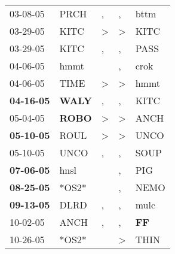 \begin{supertabular}{p{0.07\textwidth}p{0.06\textwidth}p{0.02\textwidth}p{0.02\textwidth}p{0.06\textwidth}}
          03-08-05\textsuperscript{} &           PRCH\textsuperscript{} &                , &                , &           bttm\textsuperscript{} \\
          03-29-05\textsuperscript{} &           KITC\textsuperscript{} &     \textgreater &     \textgreater &           KITC\textsuperscript{} \\
          03-29-05\textsuperscript{} &           KITC\textsuperscript{} &                , &                , &           PASS\textsuperscript{} \\
          04-06-05\textsuperscript{} &           hmmt\textsuperscript{} &                  &                , &           crok\textsuperscript{} \\
          04-06-05\textsuperscript{} &           TIME\textsuperscript{} &     \textgreater &     \textgreater &           hmmt\textsuperscript{} \\
 \textbf{04-16-05\textsuperscript{}} &  \textbf{WALY\textsuperscript{}} &                , &                , &           KITC\textsuperscript{} \\
          05-04-05\textsuperscript{} &  \textbf{ROBO\textsuperscript{}} &     \textgreater &     \textgreater &           ANCH\textsuperscript{} \\
 \textbf{05-10-05\textsuperscript{}} &           ROUL\textsuperscript{} &     \textgreater &     \textgreater &           UNCO\textsuperscript{} \\
          05-10-05\textsuperscript{} &           UNCO\textsuperscript{} &                , &                , &           SOUP\textsuperscript{} \\
 \textbf{07-06-05\textsuperscript{}} &           hnsl\textsuperscript{} &                  &                , &            PIG\textsuperscript{} \\
 \textbf{08-25-05\textsuperscript{}} &                            *OS2* &                  &                , &           NEMO\textsuperscript{} \\
 \textbf{09-13-05\textsuperscript{}} &           DLRD\textsuperscript{} &                , &                , &           mulc\textsuperscript{} \\
          10-02-05\textsuperscript{} &           ANCH\textsuperscript{} &                , &                , &    \textbf{FF\textsuperscript{}} \\
          10-26-05\textsuperscript{} &                            *OS2* &                  &     \textgreater &           THIN\textsuperscript{} \\

\end{supertabular}
